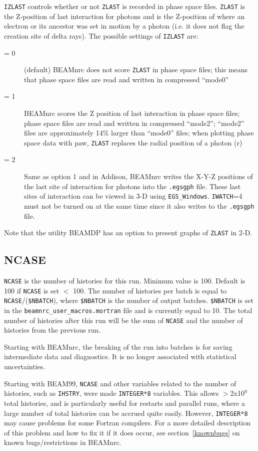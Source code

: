 \documentclass[12pt,twoside]{article}
\begin{document}
\verb+IZLAST+ controls whether or not {\tt ZLAST}
is recorded in phase space files.
{\tt ZLAST} is the Z-position of last interaction for photons and is
the Z-position of where an electron or its ancestor was set in motion by
a photon (i.e. it does not flag the creation site of delta rays).
The possible settings of \verb+IZLAST+ are:
\begin{description}
\item [= 0] (default) BEAMnrc does not score
\verb+ZLAST+
in phase space files; this means that phase space files are read and
written in compressed ``mode0''
\item [= 1] BEAMnrc scores the Z position of last interaction in phase
space files; phase space files are read and written in compressed ``mode2'';
``mode2'' files are approximately 14\% larger than ``mode0'' files; when
plotting phase space data with paw,
\verb+ZLAST+ replaces the radial position
of a photon (r)
\item [= 2] Same as option 1 and in Addison, BEAMnrc writes the X-Y-Z positions
of the last site of interaction for photons into the \verb+.egsgph+ file.
These last sites of interaction can be viewed in 3-D using
{\tt EGS\_Windows}\cite{TR99a}. {\tt IWATCH}=4
must not be turned on at the same time since it also writes to the
\verb+.egsgph+ file.

\end{description}
Note that the utility BEAMDP has an option to present graphs of {\tt ZLAST}
in 2-D.

\subsection{NCASE}
\label{ncasesect}
\verb+NCASE+ is the number of histories for this run.  Minimum
value is 100.  Default is 100 if \verb+NCASE+ is set $<$ 100.  The number of
histories per batch is equal to \verb+NCASE+/({\tt \$NBATCH}), where
{\tt \$NBATCH} is the number of output batches.   {\tt \$NBATCH} is
set in the {\tt beamnrc\_user\_macros.mortran} file and is currently
equal to 10.
The total number of histories after this run will be
the sum of \verb+NCASE+ and the number of histories from the previous run.

Starting with BEAMnrc, the breaking of the run into batches is for saving
intermediate data and diagnostics. It is no longer associated with
statistical uncertainties.

Starting with BEAM99, {\tt NCASE} and other variables related to the
number of histories,
such as {\tt IHSTRY}, were made {\tt INTEGER*8} variables.  This allows
$>$2x10$^9$ total histories, and is particularly useful for restarts and
parallel runs, where a large number of total histories can be accrued quite
easily.  However, {\tt INTEGER*8} may cause problems for some Fortran compilers.
For a more detailed description of this problem and how to fix it if it does
occur, see section~\ref{knownbugs} on known bugs/restrictions in BEAMnrc.
\end{document}
